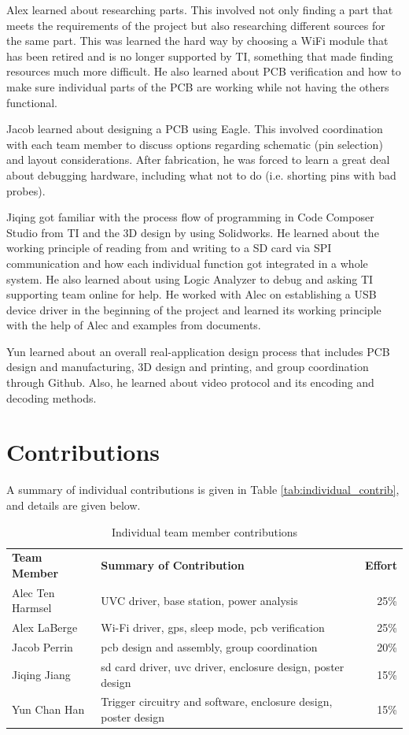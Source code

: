 \documentclass[12pt]{article}
\begin{document}
Alex learned about researching parts. This involved not only finding a part
that meets the requirements of the project but also researching different
sources for the same part. This was learned the hard way by choosing a WiFi
module that has been retired and is no longer supported by TI, something that
made finding resources much more difficult. He also learned about PCB
verification and how to make sure individual parts of the PCB are working while
not having the others functional. 

Jacob learned about designing a PCB using Eagle. This involved coordination
with each team member to discuss options regarding schematic (pin selection)
and layout considerations. After fabrication, he was forced to learn a great
deal about debugging hardware, including what not to do (i.e. shorting pins
with bad probes).

Jiqing got familiar with the process flow of programming in Code Composer
Studio from TI and the 3D design by using Solidworks. He learned about the
working principle of reading from and writing to a SD card via SPI
communication and how each individual function got integrated in a whole
system. He also learned about using Logic Analyzer to debug and asking TI
supporting team online for help. He worked with Alec on establishing a USB
device driver in the beginning of the project and learned its working principle
with the help of Alec and examples from documents.

Yun learned about an overall real-application design process that includes PCB
design and manufacturing, 3D design and printing, and group coordination
through Github. Also, he learned about video protocol and its encoding and
decoding methods.

\section{Contributions}
A summary of individual contributions is given in Table
\ref{tab:individual_contrib}, and details are given below.

\begin{table}[h]
    \centering
    \caption{Individual team member contributions}
    \begin{tabular}{llr}
        \textbf{Team Member} & \textbf{Summary of Contribution} & \textbf{Effort}\\
        Alec Ten Harmsel & UVC driver, base station, power analysis & 25\%\\
        Alex LaBerge & Wi-Fi driver, \gls{gps}, sleep mode, \gls{pcb} verification & 25\%\\
        Jacob Perrin & \gls{pcb} design and assembly, group coordination & 20\%\\
        Jiqing Jiang & \gls{sd} card driver, \gls{uvc} driver, enclosure design, poster design & 15\%\\
        Yun Chan Han & Trigger circuitry and software, enclosure design, poster design & 15\%\\
    \end{tabular}
\end{table}
\end{document}
